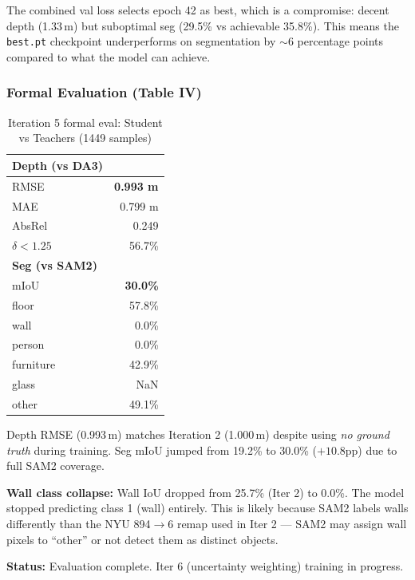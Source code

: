 \documentclass[11pt,a4paper]{article}
\begin{document}
The combined val loss selects epoch 42 as best, which is a compromise:
decent depth (1.33\,m) but suboptimal seg (29.5\% vs achievable 35.8\%).
This means the \texttt{best.pt} checkpoint underperforms on segmentation
by $\sim$6 percentage points compared to what the model can achieve.

\subsubsection{Formal Evaluation (Table IV)}

\begin{table}[h]
\centering
\caption{Iteration 5 formal eval: Student vs Teachers (1449 samples)}
\label{tab:iter5-eval}
\begin{tabular}{lr}
\toprule
\textbf{Depth (vs DA3)} & \\
\midrule
RMSE            & \textbf{0.993 m} \\
MAE             & 0.799 m \\
AbsRel          & 0.249 \\
$\delta < 1.25$ & 56.7\% \\
\midrule
\textbf{Seg (vs SAM2)} & \\
\midrule
mIoU            & \textbf{30.0\%} \\
floor           & 57.8\% \\
wall            & \textcolor{regression}{0.0\%} \\
person          & 0.0\% \\
furniture       & 42.9\% \\
glass           & NaN \\
other           & 49.1\% \\
\bottomrule
\end{tabular}
\end{table}

Depth RMSE (0.993\,m) matches Iteration 2 (1.000\,m) despite using
\emph{no ground truth} during training. Seg mIoU jumped from 19.2\%
to 30.0\% ($+10.8$pp) due to full SAM2 coverage.

\textbf{Wall class collapse:} Wall IoU dropped from 25.7\% (Iter 2) to
0.0\%. The model stopped predicting class 1 (wall) entirely. This is
likely because SAM2 labels walls differently than the NYU 894$\to$6
remap used in Iter 2 --- SAM2 may assign wall pixels to ``other'' or
not detect them as distinct objects.

\textbf{Status:} Evaluation complete. Iter 6 (uncertainty weighting)
training in progress.
\end{document}
